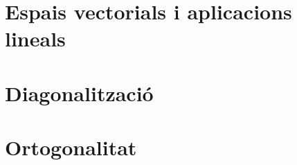 \documentclass[11pt,fleqn]{book} %
\newcounter{let} \setcounter{let}{0}
\renewcommand{\1}{\mathbf{1}}
\newcommand{\0}{\mathbf{0}}
\begin{document}
\chapter{Espais vectorials i aplicacions lineals}
{
\let\subsection\subsubsection
\let\subsubsection\paragraph

}
\chapter{Diagonalització}
{
\let\subsection\subsubsection
\let\subsubsection\paragraph

}
\chapter{Ortogonalitat}
{
\let\subsection\subsubsection
\let\subsubsection\paragraph

}
\appendix
\end{document}
